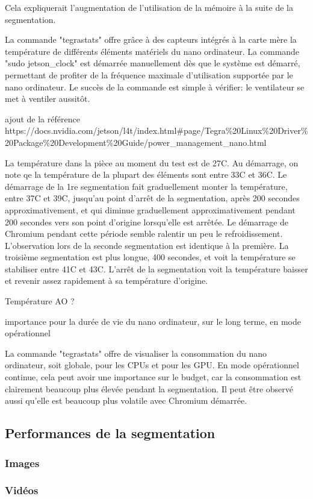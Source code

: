 \par Cela expliquerait l'augmentation de l'utilisation de la mémoire à la suite de la segmentation. 
\par La commande "tegrastats" offre grâce à des capteurs intégrés à la carte mère la température de différents éléments matériels du nano ordinateur. La commande "sudo jetson\_clock" est démarrée manuellement dès que le système est démarré, permettant de profiter de la fréquence maximale d'utilisation supportée par le nano ordinateur. Le  succès de la commande est simple à vérifier: le ventilateur se met à ventiler aussitôt. 
{\color{red} \par ajout de la référence https://docs.nvidia.com/jetson/l4t/index.html\#page/Tegra\%20Linux\%20Driver\%20Package\%20Development\%20Guide/power\_management\_nano.html }
\par La température dans la pièce au moment du test est de 27C. Au démarrage, on note qe la température de la plupart des éléments sont entre 33C et 36C. Le démarrage de la 1re segmentation fait graduellement monter la température, entre 37C et 39C, jusqu'au point d'arrêt de la segmentation, après 200 secondes approximativement, et qui diminue graduellement approximativement pendant 200 secondes vers son point d'origine lorsqu'elle est arrêtée. Le démarrage de Chromium pendant cette période semble ralentir un peu le refroidissement. L'observation lors de la seconde segmentation est identique à la première. La troisième segmentation est plus longue, 400 secondes, et voit la température se stabiliser entre 41C et 43C. L'arrêt de la segmentation voit la température baisser et revenir assez rapidement à sa température d'origine. 
{\color{red} \par Température AO ?  \par importance pour la durée de vie du nano ordinateur, sur le long terme, en mode opérationnel }
\par La commande "tegrastats" offre de visualiser la consommation du nano ordinateur, soit globale, pour les CPUs et pour les GPU. En mode opérationnel continue, cela peut avoir une importance sur le budget, car la consommation est clairement beaucoup plus élevée pendant la segmentation. Il peut être observé aussi qu'elle est beaucoup plus volatile avec Chromium démarrée. 
\subsection{Performances de la segmentation}
\subsubsection{Images}
{\color{red}
}
\subsubsection{Vidéos}
{\color{red}
}